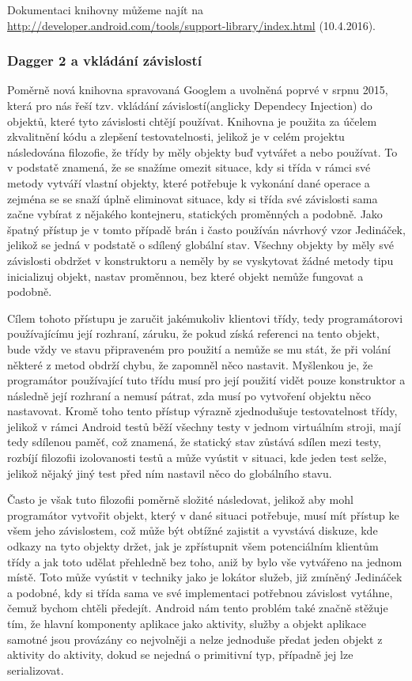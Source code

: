 \documentclass[czech,master,public,dept460,male,java,cpdeclaration]{diploma}
\begin{document}
Dokumentaci knihovny můžeme najít na \url{http://developer.android.com/tools/support-library/index.html}  (10.4.2016).

\subsubsection{Dagger 2 a vkládání závislostí}\label{dagger2}
Poměrně nová knihovna spravovaná Googlem a uvolněná poprvé v srpnu 2015, která pro nás řeší tzv. vkládání
závislostí(anglicky Dependecy Injection) do objektů,
které tyto závislosti chtějí používat. Knihovna je použita za účelem zkvalitnění kódu a zlepšení testovatelnosti, jelikož
je v celém projektu následována filozofie, že třídy by měly objekty buď vytvářet a nebo používat. To v podstatě znamená,
že se snažíme omezit situace, kdy si třída v rámci své metody vytváří vlastní objekty, které potřebuje k vykonání
dané operace a zejména se se snaží úplně eliminovat situace, kdy si třída své závislosti sama začne vybírat z nějakého
kontejneru, statických proměnných a podobně. Jako špatný přístup je v tomto případě brán i často používán návrhový vzor
Jedináček, jelikož se jedná v podstatě o sdílený globální stav. Všechny objekty by měly své závislosti obdržet v konstruktoru
a neměly by se vyskytovat žádné metody tipu inicializuj objekt, nastav proměnnou, bez které objekt nemůže fungovat a podobně.

Cílem tohoto přístupu je zaručit jakémukoliv klientovi třídy, tedy programátorovi používajícímu její rozhraní,
záruku, že pokud získá referenci na tento objekt, bude vždy ve stavu připraveném pro použití a nemůže se mu stát,
že při volání některé z metod obdrží chybu, že zapomněl něco nastavit. Myšlenkou je, že programátor používající
tuto třídu musí pro její použití vidět pouze konstruktor a následně její rozhraní a nemusí pátrat, zda musí po
vytvoření objektu něco nastavovat. Kromě toho tento přístup výrazně zjednodušuje testovatelnost třídy, jelikož v rámci
Android testů běží všechny testy v jednom virtuálním stroji, mají tedy sdílenou paměť, což znamená, že statický
stav zůstává sdílen mezi testy, rozbíjí filozofii izolovanosti testů a může vyústit v situaci, kde jeden test selže,
jelikož nějaký jiný test před ním nastavil něco do globálního stavu.

Často je však tuto filozofii poměrně složité následovat, jelikož aby mohl programátor vytvořit objekt, který
v dané situaci potřebuje, musí mít přístup ke všem jeho závislostem, což může být obtížné zajistit
a vyvstává diskuze, kde odkazy na tyto objekty držet, jak je zpřístupnit všem potenciálním klientům třídy
a jak toto udělat přehledně bez toho, aniž by bylo vše vytvářeno na jednom místě. Toto může vyústit v techniky
jako je lokátor služeb, již zmíněný Jedináček a podobné, kdy si třída sama ve své implementaci potřebnou
závislost vytáhne, čemuž bychom chtěli předejít.
Android nám tento problém také značně stěžuje tím, že hlavní komponenty aplikace jako aktivity, služby a objekt
aplikace samotné jsou provázány co nejvolněji a nelze jednoduše předat jeden objekt z aktivity do aktivity,
dokud se nejedná o primitivní typ, případně jej lze serializovat.
\end{document}
